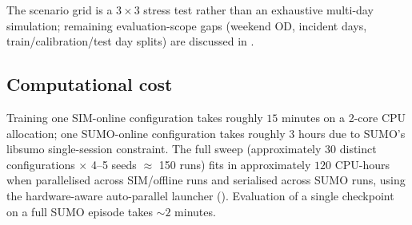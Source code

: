 The scenario grid is a $3 \times 3$ stress test rather than an exhaustive multi-day simulation; remaining evaluation-scope gaps (weekend OD, incident days, train/calibration/test day splits) are discussed in .

\subsection{Computational cost}
\label{sec:exp:compute}

Training one SIM-online configuration takes roughly $15$ minutes on a 2-core CPU allocation; one SUMO-online configuration takes roughly $3$ hours due to SUMO's libsumo single-session constraint.
The full sweep (approximately 30 distinct configurations $\times$ 4--5 seeds $\approx$ 150 runs) fits in approximately $120$ CPU-hours when parallelised across SIM/offline runs and serialised across SUMO runs, using the hardware-aware auto-parallel launcher ().
Evaluation of a single checkpoint on a full SUMO episode takes $\sim 2$ minutes.
